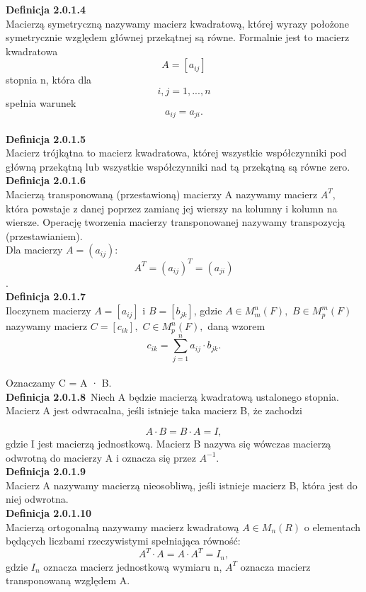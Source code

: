 \documentclass[10pt,a4paper]{report}
\begin{document}
\noindent \textbf{Definicja 2.0.1.4}\\
\noindent Macierzą symetryczną nazywamy macierz kwadratową, której wyrazy położone symetrycznie względem głównej przekątnej są równe. Formalnie jest to macierz kwadratowa $$A=[a_{ij}]$$ stopnia n, która dla $$i,j=1,...,n$$ spełnia warunek $$a_{ij}=a_{ji}.$$\\

\noindent \textbf{Definicja 2.0.1.5}\\
\noindent Macierz trójkątna to macierz kwadratowa, której wszystkie współczynniki pod główną przekątną lub wszystkie współczynniki nad tą przekątną są równe zero.\\

\noindent \textbf{Definicja 2.0.1.6}\\
\noindent Macierzą transponowaną (przestawioną) macierzy A nazywamy macierz $A^{T},$ która powstaje z danej poprzez zamianę jej wierszy na kolumny i kolumn na wiersze. Operację tworzenia macierzy transponowanej nazywamy transpozycją (przestawianiem).\\
Dla macierzy $A=(a_{ij}):$ $$ A^{T}=(a_{ij})^T=(a_{ji})$$.\\

\noindent \textbf{Definicja 2.0.1.7}\\
\noindent Iloczynem macierzy $A = [a_{ij} ]$ i $B = [b_{jk}]$, gdzie $A\in M_{m}^{n}(F), $ $B\in M_{p}^{m}(F)$ nazywamy macierz $C = [c_{ik}], $ $C \in M_{p}^{n}(F), $ daną wzorem $$ c_{ik} = \sum_{j=1}^{n} a_{ij}\cdot b_{jk}. $$\\
Oznaczamy C = A · B.\\

\noindent \textbf{Definicja 2.0.1.8}\
\noindent Niech A będzie macierzą kwadratową ustalonego stopnia. Macierz A jest odwracalna, jeśli istnieje taka macierz B, że zachodzi

 $$A\cdot B=B\cdot A=I, $$ gdzie I jest macierzą jednostkową. Macierz B nazywa się wówczas macierzą odwrotną do macierzy A i oznacza się przez  $A^{-1}.$\\

\noindent \textbf{Definicja 2.0.1.9}\\
\noindent Macierz A nazywamy macierzą nieosobliwą, jeśli istnieje macierz B, która jest do niej odwrotna.\\  

\noindent \textbf{Definicja 2.0.1.10}\\
\noindent Macierzą ortogonalną nazywamy macierz kwadratową $A\in M_{n}(R)$ o elementach będących liczbami rzeczywistymi spełniająca równość:
$$A^{T}\cdot A=A\cdot A^{T}=I_{n},$$ gdzie $I_{n}$ oznacza macierz jednostkową wymiaru n, $A^{T}$ oznacza macierz transponowaną względem A.\\
\end{document}
